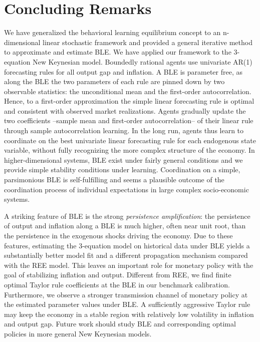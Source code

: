 \section{Concluding Remarks}
We have generalized the behavioral learning equilibrium concept to an n-dimensional linear stochastic framework and provided a general iterative method to approximate and estimate BLE.
We have applied our framework to the 3-equation New Keynesian model. Boundedly rational agents use univariate AR(1) forecasting rules for all output gap and inflation. A BLE is parameter free, as along the BLE the two parameters of each rule are pinned down by two observable statistics: the unconditional mean and the first-order
autocorrelation. Hence, to a first-order approximation the simple linear forecasting rule is optimal and consistent with observed market realizations. Agents gradually update the two coefficients --sample mean and
first-order autocorrelation-- of their linear rule through sample autocorrelation learning. In the long run, agents thus learn to coordinate on the best univariate linear forecasting rule for each endogenous state variable, without fully recognizing the more complex structure of the economy.  In higher-dimensional systems, BLE exist under fairly general conditions and we provide simple stability conditions under learning. Coordination on a simple, parsimonious BLE is self-fulfilling and seems a plausible outcome of the coordination process of individual expectations in large complex socio-economic systems.

A striking feature of BLE is the strong {\it persistence amplification}: the persistence of output and inflation along a BLE is much higher, often near unit root, than the persistence in the exogenous shocks driving the economy. Due to these features, estimating the 3-equation model on historical data under BLE yields a substantially better model fit and a different propagation mechanism compared with the REE model.
This leaves an important role for monetary policy with the goal of stabilizing inflation and output.  Different from REE, we find finite optimal Taylor rule coefficients at the BLE in our benchmark calibration. Furthermore, we observe a stronger transmission channel of monetary policy at the estimated parameter values under BLE. A sufficiently aggressive Taylor rule may keep the economy in a stable region with relatively low volatility in inflation and output gap. Future work should study BLE and corresponding optimal policies in more general New Keynesian models.

 

\vskip1cm    


\clearpage